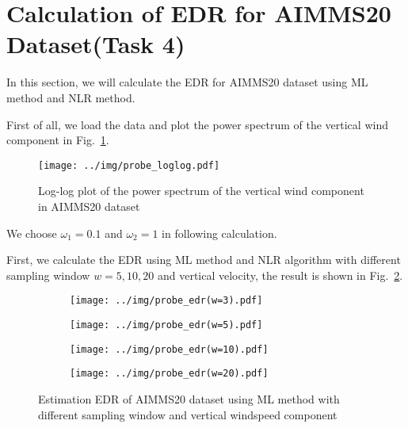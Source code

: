 \documentclass[runningheads]{llncs}
\begin{document}
\section{Calculation of EDR for AIMMS20 Dataset(Task 4)}

In this section, we will calculate the EDR for AIMMS20 dataset using ML method and NLR method.

First of all, we load the data and plot the power spectrum of the vertical wind component in Fig.~\ref{fig:4}.

\begin{figure}[!htbp]
    \centering
    \texttt{[image: ../img/probe\_loglog.pdf]}
    \caption{Log-log plot of the power spectrum of the vertical wind component in AIMMS20 dataset}
    \label{fig:4}
\end{figure}

We choose $\omega_1=0.1$ and $\omega_2=1$ in following calculation.

First, we calculate the EDR using ML method and NLR algorithm with different sampling window $w=5,10,20$ and vertical velocity, the result is shown in Fig.~\ref{fig:6}.

\begin{figure}[!htbp]
    \centering
    \begin{subfigure}{.4\textwidth}
        \centering
        \texttt{[image: ../img/probe\_edr(w=3).pdf]}
    \end{subfigure}
    \begin{subfigure}{.4\textwidth}
        \centering
        \texttt{[image: ../img/probe\_edr(w=5).pdf]}
    \end{subfigure}
    \begin{subfigure}{.4\textwidth}
        \centering
        \texttt{[image: ../img/probe\_edr(w=10).pdf]}
    \end{subfigure}
    \begin{subfigure}{.4\textwidth}
        \centering
        \texttt{[image: ../img/probe\_edr(w=20).pdf]}
    \end{subfigure}
    \caption{Estimation EDR of AIMMS20 dataset using ML method with different sampling window and vertical windspeed component}
    \label{fig:6}
\end{figure}

\end{document}
